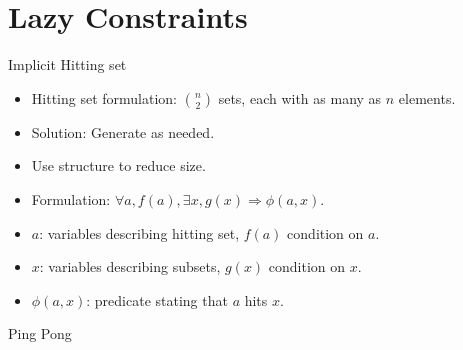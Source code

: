 \section{Lazy Constraints}
\label{sec:lazy}
\begin{frame}{Implicit Hitting set}
  \begin{itemize}
  \item Hitting set formulation: $\binom{n}{2}$ sets, each with as
    many as $n$ elements.
  \item Solution: Generate as needed.
  \item Use structure to reduce size.
  \item Formulation: $\forall a, f(a), \exists x, g(x) \Rightarrow
    \phi(a,x)$.
  \item $a$: variables describing hitting set, $f(a)$ condition on $a$.
  \item $x$: variables describing subsets, $g(x)$ condition on $x$.
  \item $\phi(a,x)$: predicate stating that $a$ hits $x$.
  \end{itemize}
\end{frame}
\begin{frame}{Ping Pong}
  \begin{center}
    \scalebox{0.5}{%
       }
  \end{center}
\end{frame}

